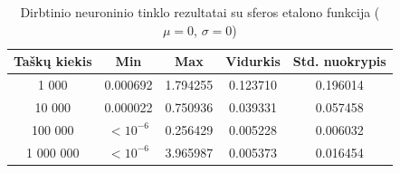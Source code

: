 \begin{table}[H]
    \centering
    \begin{tabular}{|c|c|c|c|c|}
        \hline
        \textbf{Taškų kiekis} & \textbf{Min} & \textbf{Max} & \textbf{Vidurkis} & \textbf{Std. nuokrypis} \\ \hline
        1 000        & 0.000692 & 1.794255 & 0.123710 & 0.196014 \\ \hline
        10 000       & 0.000022 & 0.750936 & 0.039331 & 0.057458 \\ \hline
        100 000      & $<10^{-6}$ & 0.256429 & 0.005228 & 0.006032 \\ \hline
        1 000 000    & $<10^{-6}$ & 3.965987 & 0.005373 & 0.016454 \\ \hline
    \end{tabular}
    \caption{Dirbtinio neuroninio tinklo rezultatai su sferos etalono funkcija ($\mu = 0$, $\sigma = 0$)}
\end{table}